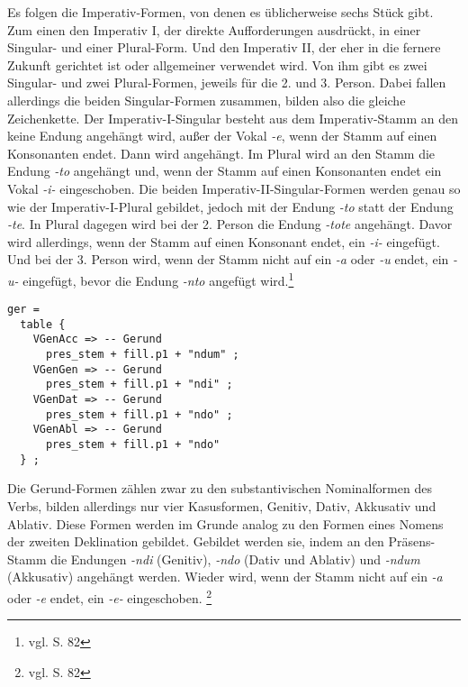 Es folgen die Imperativ-Formen, von denen es üblicherweise sechs Stück gibt. Zum einen den Imperativ I, der direkte Aufforderungen ausdrückt, in einer Singular- und einer Plural-Form. Und den Imperativ II, der eher in die fernere Zukunft gerichtet ist oder allgemeiner verwendet wird. Von ihm gibt es zwei Singular- und zwei Plural-Formen, jeweils für die 2. und 3. Person. Dabei fallen allerdings die beiden Singular-Formen zusammen, bilden also die gleiche Zeichenkette. Der Imperativ-I-Singular besteht aus dem Imperativ-Stamm an den keine Endung angehängt wird, außer der Vokal \textit{-e}, wenn der Stamm auf einen Konsonanten endet. Dann wird  angehängt. Im Plural wird an den Stamm die Endung \textit{-to} angehängt und, wenn der Stamm auf einen Konsonanten endet ein Vokal \textit{-i-} eingeschoben. Die beiden Imperativ-II-Singular-Formen werden genau so wie der Imperativ-I-Plural gebildet, jedoch mit der Endung \textit{-to} statt der Endung \textit{-te}. In Plural dagegen wird bei der 2. Person die Endung \textit{-tote} angehängt. Davor wird allerdings, wenn der Stamm auf einen Konsonant endet, ein \textit{-i-} eingefügt. Und bei der 3. Person wird, wenn der Stamm nicht auf ein \textit{-a} oder \textit{-u} endet, ein \textit{-u-} eingefügt, bevor die Endung \textit{-nto} angefügt wird.\footnote{vgl. \cite{BAYER-LINDAUER1994} S. 82} \par
\begin{lstlisting}[float=h!tp,caption={Ausschnitt aus der Funktion \texttt{mkVerb} um Gerundiv-Verbformen zu bilden (vgl. \textbf{ResLat.gf})},label={GF-Res-MkVerb-Ger},basicstyle=\small]
ger = 
  table {
    VGenAcc => -- Gerund
      pres_stem + fill.p1 + "ndum" ;
    VGenGen => -- Gerund
      pres_stem + fill.p1 + "ndi" ;
    VGenDat => -- Gerund
      pres_stem + fill.p1 + "ndo" ;
    VGenAbl => -- Gerund
      pres_stem + fill.p1 + "ndo" 
  } ;
\end{lstlisting}
Die Ge\-rund-For\-men zählen zwar zu den sub\-stan\-ti\-vi\-schen No\-mi\-nal\-fo\-rmen des Verbs, bilden allerdings nur vier Kasusformen, Genitiv, Dativ, Akkusativ und Ablativ. Diese Formen werden im Grunde analog zu den Formen eines Nomens der zweiten Deklination gebildet. Gebildet werden sie, indem an den Präsens-Stamm die Endungen \textit{-ndi} (Genitiv), \textit{-ndo} (Dativ und Ablativ) und \textit{-ndum} (Akkusativ) angehängt werden. Wieder wird, wenn der Stamm nicht auf ein \textit{-a} oder \textit{-e} endet, ein \textit{-e-} eingeschoben. \footnote{vgl. \cite{BAYER-LINDAUER1994} S. 82} \par
